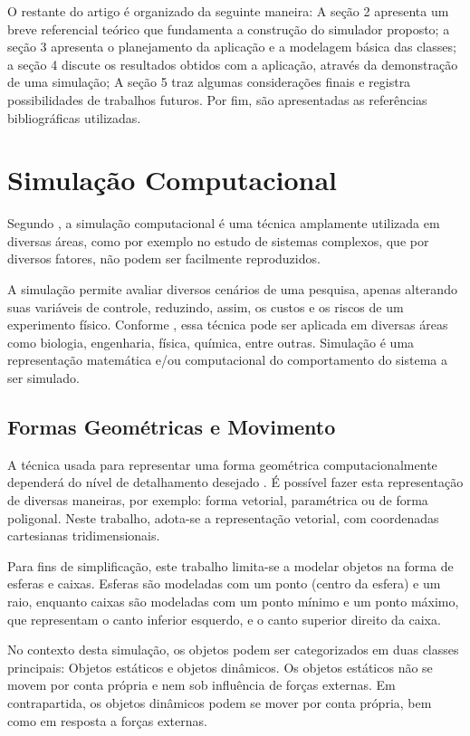 \documentclass[12pt]{article}
\begin{document}
O restante do artigo é organizado da seguinte maneira: A seção 2 apresenta um breve referencial teórico que fundamenta a construção do simulador proposto; a seção 3 apresenta o planejamento da aplicação e a modelagem básica das classes; a seção 4 discute os resultados obtidos com a aplicação, através da demonstração de uma simulação; A seção 5 traz algumas considerações finais e registra possibilidades de trabalhos futuros. Por fim, são apresentadas as referências bibliográficas utilizadas.

\section{Simulação Computacional}

Segundo \cite{duran2018computer}, a simulação computacional é uma técnica amplamente utilizada em diversas áreas, como por exemplo no estudo de sistemas complexos, que por diversos fatores, não podem ser facilmente reproduzidos.

A simulação permite avaliar diversos cenários de uma pesquisa, apenas alterando suas variáveis de controle, reduzindo, assim, os custos e os riscos de um experimento físico. Conforme \cite{marschner2018}, essa técnica pode ser aplicada em diversas áreas como biologia, engenharia, física, química, entre outras. Simulação é uma representação matemática e/ou computacional do comportamento do sistema a ser simulado.

\subsection{Formas Geométricas e Movimento}
A técnica usada para representar uma forma geométrica computacionalmente dependerá do nível de detalhamento desejado \cite{pharr2016}. É possível fazer esta representação de diversas maneiras, por exemplo: forma vetorial, paramétrica ou de forma poligonal. Neste trabalho, adota-se a representação vetorial, com coordenadas cartesianas tridimensionais.

Para fins de simplificação, este trabalho limita-se a modelar objetos na forma de esferas e caixas. Esferas são modeladas com um ponto (centro da esfera) e um raio, enquanto caixas são modeladas com um ponto mínimo e um ponto máximo, que representam o canto inferior esquerdo, e o canto superior direito da caixa.

No contexto desta simulação, os objetos podem ser categorizados em duas classes principais: Objetos estáticos e objetos dinâmicos. Os objetos estáticos não se movem por conta própria e nem sob influência de forças externas. Em contrapartida, os objetos dinâmicos podem se mover por conta própria, bem como em resposta a forças externas.
\end{document}
